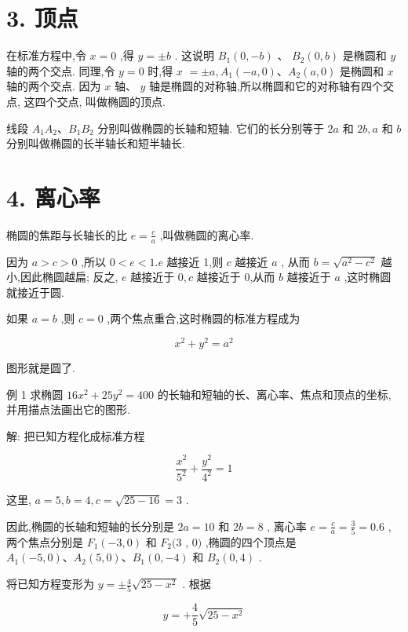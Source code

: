 \documentclass[lang=cn,newtx,10pt,scheme=chinese]{elegantbook}
\begin{document}
\section*{3. 顶点}

在标准方程中,令 \(x = 0\) ,得 \(y = \pm b\) . 这说明 \({B}_{1}\left( {0, - b}\right)\) 、 \({B}_{2}\left( {0,b}\right)\) 是椭圆和 \(y\) 轴的两个交点. 同理,令 \(y = 0\) 时,得 \(x\) \(= \pm a,{A}_{1}\left( {-a,0}\right) \text{、}{A}_{2}\left( {a,0}\right)\) 是椭圆和 \(x\) 轴的两个交点. 因为 \(x\) 轴、 \(y\) 轴是椭圆的对称轴,所以椭圆和它的对称轴有四个交点, 这四个交点, 叫做椭圆的顶点.

线段 \({A}_{1}{A}_{2}\text{、}{B}_{1}{B}_{2}\) 分别叫做椭圆的长轴和短轴. 它们的长分别等于 \({2a}\) 和 \({2b},a\) 和 \(b\) 分别叫做椭圆的长半轴长和短半轴长.

\section*{4. 离心率}

椭圆的焦距与长轴长的比 \(e = \frac{c}{a}\) ,叫做椭圆的离心率.

因为 \(a > c > 0\) ,所以 \(0 < e < 1.e\) 越接近 1,则 \(c\) 越接近 \(a\) , 从而 \(b = \sqrt{{a}^{2} - {c}^{2}}\) 越小,因此椭圆越扁; 反之, \(e\) 越接近于 \(0,c\) 越接近于 0,从而 \(b\) 越接近于 \(a\) ,这时椭圆就接近于圆.

如果 \(a = b\) ,则 \(c = 0\) ,两个焦点重合,这时椭圆的标准方程成为

\[
    {x}^{2} + {y}^{2} = {a}^{2}
\]

图形就是圆了.

例 1 求椭圆 \({16}{x}^{2} + {25}{y}^{2} = {400}\) 的长轴和短轴的长、离心率、焦点和顶点的坐标, 并用描点法画出它的图形.

解: 把已知方程化成标准方程

\[
  \frac{{x}^{2}}{{5}^{2}} + \frac{{y}^{2}}{{4}^{2}} = 1
\]

这里, \(a = 5,b = 4,c = \sqrt{{25} - {16}} = 3\) .

因此,椭圆的长轴和短轴的长分别是 \({2a} = {10}\) 和 \({2b} = 8\) , 离心率 \(e = \frac{c}{a} = \frac{3}{5} = {0.6}\) ,两个焦点分别是 \({F}_{1}\left( {-3,0}\right)\) 和 \({F}_{2}(3\) , \(0)\) ,椭圆的四个顶点是 \({A}_{1}\left( {-5,0}\right) \text{、}{A}_{2}\left( {5,0}\right) \text{、}{B}_{1}\left( {0, - 4}\right)\) 和 \({B}_{2}\left( {0,4}\right)\) .

将已知方程变形为 \(y = \pm \frac{4}{5}\sqrt{{25} - {x}^{2}}\) . 根据

\[
  y = + \frac{4}{5}\sqrt{{25} - {x}^{2}}
\]
\end{document}
